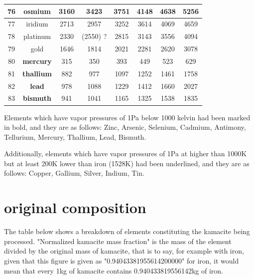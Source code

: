 \documentclass[a4paper]{article}
\begin{document}
\begin{center}
\begin{tabular}{|c|c|c|c|c|c|c|c|}
			\hline
			76 & osmium & 3160 & 3423 & 3751 & 4148 & 4638 & 5256 \\
			\hline
			77 & iridium & 2713 & 2957 & 3252 & 3614 & 4069 & 4659 \\
			\hline
			78 & platinum & 2330 & (2550) ? & 2815 & 3143 & 3556 & 4094 \\
			\hline
			79 & gold & 1646 & 1814 & 2021 & 2281 & 2620 & 3078 \\
			\hline
			80 & \textbf{mercury} & 315 & 350 & 393 & 449 & 523 & 629 \\
			\hline
			81 & \textbf{thallium} & 882 & 977 & 1097 & 1252 & 1461 & 1758 \\
			\hline
			82 & \textbf{lead} & 978 & 1088 & 1229 & 1412 & 1660 & 2027 \\
			\hline
			83 & \textbf{bismuth} & 941 & 1041 & 1165 & 1325 & 1538 & 1835 \\
			\hline
		\end{tabular}
	\end{center}
    
    \noindent Elements which have vapor pressures of 1Pa below 1000 kelvin had been marked in bold, and they are as follows:
    Zinc, Arsenic, Selenium, Cadmium, Antimony, Tellurium, Mercury, Thallium, Lead, Bismuth.
    
    \medskip
    
    \noindent Additionally, elements which have vapor pressures of 1Pa at higher than 1000K but at least 200K lower than iron (1528K) had been underlined, and they are as follows:
    Copper, Gallium, Silver, Indium, Tin.
    
	\pagebreak
	
	\section{original composition}
	
	The table below shows a breakdown of elements constituting the kamacite being processed.
	"Normalized kamacite mass fraction" is the mass of the element divided by the original mass of kamacite, that is to say, for example with iron, given that this figure is given as "0.94043381955614200000" for iron, it would mean that every 1kg of kamacite contains 0.940433819556142kg of iron.
	
\end{document}
